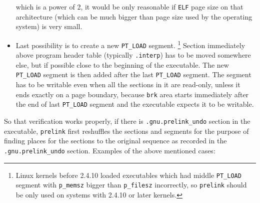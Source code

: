 \documentclass[twoside]{article}
\def\tts#1{\texttt{\small #1}}
\begin{document}
\begin{itemize}
which is a power of 2, it would be only reasonable if \tts{ELF} page size
on that architecture (which can be much bigger than page size used by the
operating system) is very small.
\item Last possibility is to create a new \tts{PT\_LOAD} segment.
\footnote{Linux kernels before 2.4.10 loaded executables which had middle \tts{PT\_LOAD}
segment with \tts{p\_memsz} bigger than \tts{p\_filesz} incorrectly, so
\tts{prelink} should be only used on systems with 2.4.10 or later kernels.}
Section immediately above program header table (typically \tts{.interp})
has to be moved somewhere else, but if possible close to the beginning
of the executable.  The new \tts{PT\_LOAD} segment is then added after the
last \tts{PT\_LOAD} segment.  The segment has to be writable even when
all the sections in it are read-only, unless it ends exactly on a page
boundary, because \tts{brk} area starts immediately after the end of last
\tts{PT\_LOAD} segment and the executable expects it to be writable.
\end{itemize}

So that verification works properly, if there is \tts{.gnu.prelink\_undo}
section in the executable, \tts{prelink} first reshuffles the sections and
segments for the purpose of finding places for the sections to the original
sequence as recorded in the \tts{.gnu.prelink\_undo} section.
Examples of the above mentioned cases:
\end{document}
